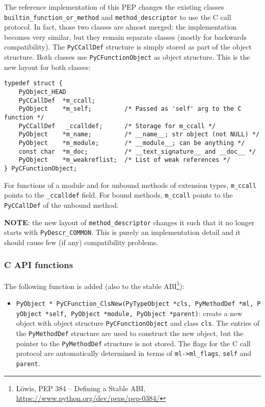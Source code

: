 The reference implementation of this PEP changes the existing classes
\texttt{builtin\_function\_or\_method} and \texttt{method\_descriptor}
to use the C call protocol. In fact, those two classes are almost
merged: the implementation becomes very similar, but they remain
separate classes (mostly for backwards compatibility). The
\texttt{PyCCallDef} structure is simply stored as part of the object
structure. Both classes use \texttt{PyCFunctionObject} as object
structure. This is the new layout for both classes:

\begin{verbatim}
typedef struct {
    PyObject_HEAD
    PyCCallDef  *m_ccall;
    PyObject    *m_self;         /* Passed as 'self' arg to the C function */
    PyCCallDef   _ccalldef;      /* Storage for m_ccall */
    PyObject    *m_name;         /* __name__; str object (not NULL) */
    PyObject    *m_module;       /* __module__; can be anything */
    const char  *m_doc;          /* __text_signature__ and __doc__ */
    PyObject    *m_weakreflist;  /* List of weak references */
} PyCFunctionObject;
\end{verbatim}

For functions of a module and for unbound methods of extension types,
\texttt{m\_ccall} points to the \texttt{\_ccalldef} field. For bound
methods, \texttt{m\_ccall} points to the \texttt{PyCCallDef} of the
unbound method.

\textbf{NOTE}: the new layout of \texttt{method\_descriptor} changes it
such that it no longer starts with \texttt{PyDescr\_COMMON}. This is
purely an implementation detail and it should cause few (if any)
compatibility problems.

\subsubsection{C API functions}

The following function is added (also to the stable ABI\footnote{Löwis,
  PEP 384 -- Defining a Stable ABI,
  \url{https://www.python.org/dev/peps/pep-0384/}}):

\begin{itemize}
\tightlist
\item
  \texttt{PyObject\ *\ PyCFunction\_ClsNew(PyTypeObject\ *cls,\ PyMethodDef\ *ml,\ PyObject\ *self,\ PyObject\ *module,\ PyObject\ *parent)}:
  create a new object with object structure \texttt{PyCFunctionObject}
  and class \texttt{cls}. The entries of the \texttt{PyMethodDef}
  structure are used to construct the new object, but the pointer to the
  \texttt{PyMethodDef} structure is not stored. The flags for the C call
  protocol are automatically determined in terms of
  \texttt{ml-\textgreater{}ml\_flags}, \texttt{self} and
  \texttt{parent}.
\end{itemize}

